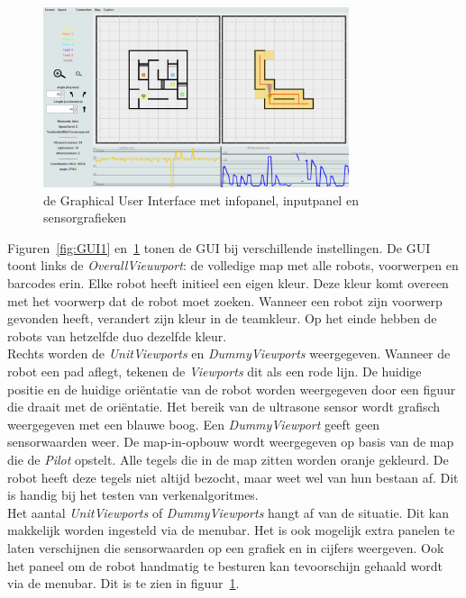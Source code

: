\documentclass[tt2]{penoverslag}
\begin{document}
\begin{figure}[h]
\centering
	\includegraphics[width=0.8\textwidth]{GUI2}
\caption{de Graphical User Interface met infopanel, inputpanel en sensorgrafieken}
\label{fig:GUI2}
\end{figure}

Figuren~\ref{fig:GUI1} en~\ref{fig:GUI2} tonen de GUI bij verschillende instellingen. De GUI toont links de \textit{OverallVieuwport}: de volledige map met alle robots, voorwerpen en barcodes erin. Elke robot heeft initieel een eigen kleur. Deze kleur komt overeen met het voorwerp dat de robot moet zoeken. Wanneer een robot zijn voorwerp gevonden heeft, verandert zijn kleur in de teamkleur. Op het einde hebben de robots van hetzelfde duo dezelfde kleur.\\

Rechts worden de \textit{UnitViewports} en \textit{DummyViewports} weergegeven. Wanneer de robot een pad aflegt, tekenen de \textit{Viewports} dit als een rode lijn. De huidige positie en de huidige ori\"entatie van de robot worden weergegeven door een figuur die draait met de ori\"entatie. Het bereik van de ultrasone sensor wordt grafisch weergegeven met een blauwe boog. Een \textit{DummyViewport} geeft geen sensorwaarden weer. De map-in-opbouw wordt weergegeven op basis van de map die de \textit{Pilot} opstelt. Alle tegels die in de map zitten worden oranje gekleurd. De robot heeft deze tegels niet altijd bezocht, maar weet wel van hun bestaan af. Dit is handig bij het testen van verkenalgoritmes.\\

Het aantal \textit{UnitViewports} of \textit{DummyViewports} hangt af van de situatie. Dit kan makkelijk worden ingesteld via de menubar. Het is ook mogelijk extra panelen te laten verschijnen die sensorwaarden op een grafiek en in cijfers weergeven. Ook het paneel om de robot handmatig te besturen kan tevoorschijn gehaald wordt via de menubar. Dit is te zien in figuur~\ref{fig:GUI2}.
\end{document}
